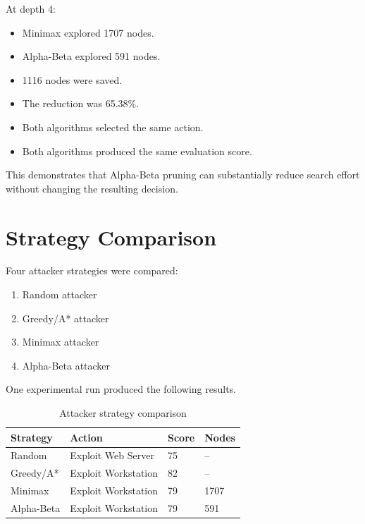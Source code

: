 \documentclass[12pt,a4paper]{article}
\begin{document}
At depth 4:

\begin{itemize}
    \item Minimax explored 1707 nodes.
    \item Alpha-Beta explored 591 nodes.
    \item 1116 nodes were saved.
    \item The reduction was 65.38\%.
    \item Both algorithms selected the same action.
    \item Both algorithms produced the same evaluation score.
\end{itemize}

This demonstrates that Alpha-Beta pruning can substantially reduce search
effort without changing the resulting decision.


\section{Strategy Comparison}

Four attacker strategies were compared:

\begin{enumerate}
    \item Random attacker
    \item Greedy/A* attacker
    \item Minimax attacker
    \item Alpha-Beta attacker
\end{enumerate}

One experimental run produced the following results.

\begin{table}[H]
\centering
\begin{tabular}{p{} p{} p{} p{}}
\toprule
\textbf{Strategy} & \textbf{Action} & \textbf{Score} & \textbf{Nodes} \\
\midrule
Random &
Exploit Web Server &
75 &
-- \\

Greedy/A* &
Exploit Workstation &
82 &
-- \\

Minimax &
Exploit Workstation &
79 &
1707 \\

Alpha-Beta &
Exploit Workstation &
79 &
591 \\

\bottomrule
\end{tabular}
\caption{Attacker strategy comparison}
\end{table}
\end{document}
